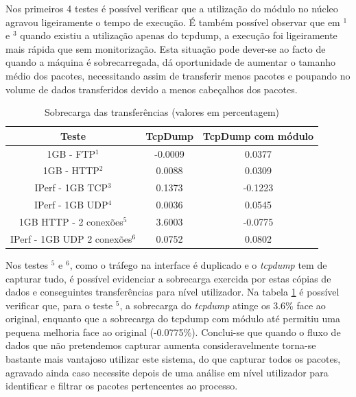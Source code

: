 \documentclass[a4paper]{llncs}
\begin{document}
Nos primeiros 4 testes é possível verificar que a utilização do módulo no núcleo agravou ligeiramente o tempo de execução. É também possível observar que em $^{1}$ e $^{3}$ quando existiu a utilização apenas do tcpdump, a execução foi ligeiramente mais rápida que sem monitorização. Esta situação pode dever-se ao facto de quando a máquina é sobrecarregada, dá oportunidade de aumentar o tamanho médio dos pacotes,  necessitando assim de transferir menos pacotes e poupando no volume de dados transferidos devido a menos cabeçalhos dos pacotes.

\begin{table}
\begin{center}

\begin{tabular}{ | c | c | c |}
\hline
Teste & \hspace {0.3cm} TcpDump \hspace {0.3cm} & TcpDump com módulo  \\

\hline
1GB - FTP$^{1}$ & -0.0009  & 0.0377  \\
1GB - HTTP$^{2}$ & 0.0088 &  0.0309   \\
IPerf - 1GB TCP$^{3}$ & 0.1373 &  -0.1223   \\
IPerf - 1GB UDP$^{4}$ & 0.0036 & 0.0545 \\
\hline
\hline
1GB HTTP - 2 conexões$^{5}$ & 3.6003 & -0.0775   \\
IPerf - 1GB UDP 2 conexões$^{6}$ & 0.0752 & 0.0802   \\
\hline
\end{tabular}
\caption{Sobrecarga das transferências (valores em percentagem)}
\label{tab:overhead}
\end{center}
\end{table}

Nos testes $^{5}$ e $^{6}$, como o tráfego na interface é duplicado e o \textit{tcpdump} tem de capturar tudo, é possível evidenciar a sobrecarga exercida por estas cópias de dados e conseguintes transferências para nível utilizador. Na tabela \ref{tab:overhead} é possível verificar que, para o teste $^{5}$, a sobrecarga do \textit{tcpdump} atinge os 3.6\% face ao original, enquanto que a sobrecarga do tcpdump com módulo até permitiu uma pequena melhoria face ao original (-0.0775\%). Conclui-se que quando o fluxo de dados que não pretendemos capturar aumenta consideravelmente torna-se bastante mais vantajoso utilizar este sistema, do que capturar todos os pacotes, agravado ainda caso necessite depois de uma análise em nível utilizador para identificar e filtrar os pacotes pertencentes ao processo.
\end{document}
